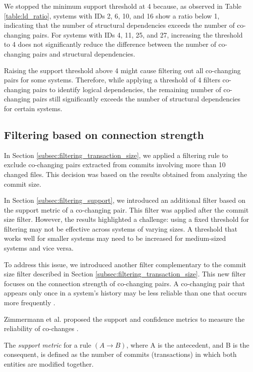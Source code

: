 We stopped the minimum support threshold at 4 because, as observed in Table \ref{table:ld_ratio}, systems with IDs 2, 6, 10, and 16 show a ratio below 1, indicating that the number of structural dependencies exceeds the number of co-changing pairs. For systems with IDs 4, 11, 25, and 27, increasing the threshold to 4 does not significantly reduce the difference between the number of co-changing pairs and structural dependencies.

Raising the support threshold above 4 might cause filtering out all co-changing pairs for some systems. Therefore, while applying a threshold of 4 filters co-changing pairs to identify logical dependencies, the remaining number of co-changing pairs still significantly exceeds the number of structural dependencies for certain systems.


\subsection{Filtering based on connection strength}
\label{subsec:filtering_connection_strength}

\hspace{4em}In Section \ref{subsec:filtering_transaction_size}, we applied a filtering rule to exclude co-changing pairs extracted from commits involving more than 10 changed files. This decision was based on the results obtained from analyzing the commit size.

In Section \ref{subsec:filtering_support}, we introduced an additional filter based on the support metric of a co-changing pair. This filter was applied after the commit size filter. However, the results highlighted a challenge: using a fixed threshold for filtering may not be effective across systems of varying sizes. A threshold that works well for smaller systems may need to be increased for medium-sized systems and vice versa.

To address this issue, we introduced another filter complementary to the commit size filter described in Section \ref{subsec:filtering_transaction_size}. This new filter focuses on the connection strength of co-changing pairs. A co-changing pair that appears only once in a system's history may be less reliable than one that occurs more frequently \cite{cluster-access}.

Zimmermann et al. proposed the support and confidence metrics to measure the reliability of co-changes \cite{Zimmermann:2004:MVH:998675.999460}.

The \textit{support metric} for a rule $(A \rightarrow B)$, where A is the antecedent, and B is the consequent, is defined as the number of commits (transactions) in which both entities are modified together.

